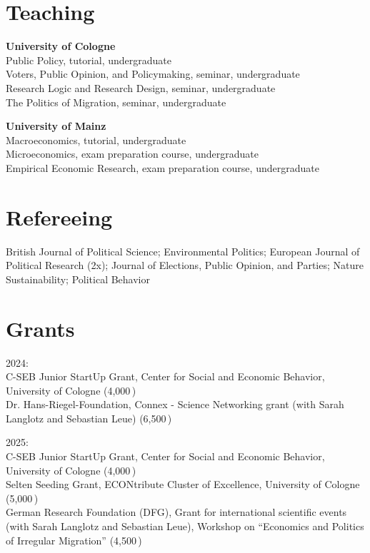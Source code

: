 \documentclass[a4paper,11pt]{article}
\begin{document}
\section{Teaching}

\textbf{University of Cologne}\\
Public Policy, tutorial, undergraduate\\
Voters, Public Opinion, and Policymaking, seminar, undergraduate\\
Research Logic and Research Design, seminar, undergraduate\\
The Politics of Migration, seminar, undergraduate

\vspace{6pt}

\textbf{University of Mainz}\\
Macroeconomics, tutorial, undergraduate\\
Microeconomics, exam preparation course, undergraduate\\
Empirical Economic Research, exam preparation course, undergraduate

\section{Refereeing}

British Journal of Political Science; Environmental Politics; European Journal of Political Research (2x); Journal of Elections, Public Opinion, and Parties;
Nature Sustainability; Political Behavior

\section{Grants}

2024:\\
C-SEB Junior StartUp Grant, Center for Social and Economic Behavior, University of Cologne (4,000\,\texteuro)\\
Dr. Hans-Riegel-Foundation, Connex - Science Networking grant (with Sarah Langlotz and Sebastian Leue) (6,500\,\texteuro)

\vspace{6pt}

2025:\\
C-SEB Junior StartUp Grant, Center for Social and Economic Behavior, University of Cologne (4,000\,\texteuro)\\
Selten Seeding Grant, ECONtribute Cluster of Excellence, University of Cologne (5,000\,\texteuro)\\
German Research Foundation (DFG), Grant for international scientific events (with Sarah Langlotz and Sebastian Leue), Workshop on ``Economics and Politics of Irregular Migration'' (4,500\,\texteuro)
\end{document}
